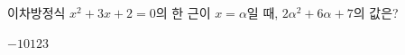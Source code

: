 이차방정식 $x^2+3x+2=0$의 한 근이 $x=\alpha$일 때, $2\alpha^2+6\alpha+7$의 값은?
\begin{choices32}{$-1$}{$0$}{$1$}{$2$}{$3$}\end{choices32}
